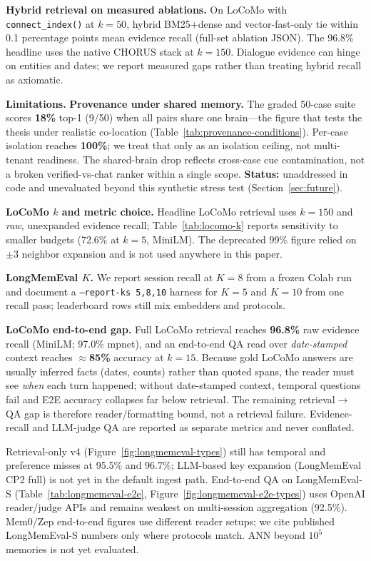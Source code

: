\documentclass[11pt]{article}
\begin{document}
\textbf{Hybrid retrieval on measured ablations.} On LoCoMo with
\texttt{connect\_index()} at $k{=}50$, hybrid BM25+dense and vector-fast-only
tie within 0.1 percentage points mean evidence recall (full-set ablation JSON).
The 96.8\% headline uses the native CHORUS stack at $k{=}150$. Dialogue evidence can hinge
on entities and dates; we report measured gaps rather than treating hybrid recall
as axiomatic.

\textbf{Limitations.}
\textbf{Provenance under shared memory.} The graded 50-case suite scores
\textbf{18\%} top-1 (9/50) when all pairs share one brain---the figure that tests
the thesis under realistic co-location (Table~\ref{tab:provenance-conditions}).
Per-case isolation reaches \textbf{100\%}; we treat that only as an isolation
ceiling, not multi-tenant readiness. The shared-brain drop reflects cross-case
cue contamination, not a broken verified-vs-chat ranker within a single scope.
\textbf{Status:} unaddressed in code and unevaluated beyond this synthetic stress
test (Section~\ref{sec:future}).

\textbf{LoCoMo $k$ and metric choice.} Headline LoCoMo retrieval uses $k{=}150$
and \emph{raw}, unexpanded evidence recall; Table~\ref{tab:locomo-k} reports
sensitivity to smaller budgets (72.6\% at $k{=}5$, MiniLM). The deprecated 99\%
figure relied on $\pm3$ neighbor expansion and is not used anywhere in this paper.

\textbf{LongMemEval $K$.} We report session recall at $K{=}8$ from a frozen Colab
run and document a \texttt{--report-ks 5,8,10} harness for $K{=}5$ and $K{=}10$
from one recall pass; leaderboard rows still mix embedders and protocols.

\textbf{LoCoMo end-to-end gap.} Full LoCoMo retrieval reaches \textbf{96.8\%} raw
evidence recall (MiniLM; 97.0\% mpnet), and an end-to-end QA read over
\emph{date-stamped} context reaches $\approx$\textbf{85\%} accuracy at $k{=}15$.
Because gold LoCoMo answers are usually inferred facts (dates, counts) rather than
quoted spans, the reader must see \emph{when} each turn happened; without
date-stamped context, temporal questions fail and E2E accuracy collapses far below
retrieval. The remaining retrieval$\to$QA gap is therefore reader/formatting
bound, not a retrieval failure. Evidence-recall and LLM-judge QA are reported as
separate metrics and never conflated.

Retrieval-only v4 (Figure~\ref{fig:longmemeval-types}) still has temporal and
preference misses at 95.5\% and 96.7\%; LLM-based key expansion (LongMemEval CP2
full) is not yet in the default ingest path. End-to-end QA on LongMemEval-S
(Table~\ref{tab:longmemeval-e2e}, Figure~\ref{fig:longmemeval-e2e-types}) uses
OpenAI reader/judge APIs and remains weakest on multi-session aggregation (92.5\%).
Mem0/Zep end-to-end figures use different reader setups; we cite published
LongMemEval-S numbers only where protocols match. ANN beyond $10^5$ memories is
not yet evaluated.
\end{document}
